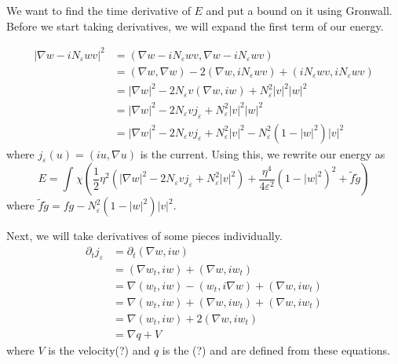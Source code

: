 \documentclass[a4paper]{article}
\begin{document}
We want to find the time derivative of $E$ and put a bound on it using Gronwall.
Before we start taking derivatives, we will expand the first term of our energy.

\begin{align*}
  |\nabla w - iN_\varepsilon w v|^2 &= ( \nabla w - iN_\varepsilon w v , \nabla w - iN_\varepsilon w v ) \\
  &= (\nabla w, \nabla w ) - 2 ( \nabla w, iN_\varepsilon w v ) + ( i N_\varepsilon w v, i N_\varepsilon w v ) \\
  &= | \nabla w |^2 - 2 N_\varepsilon v ( \nabla w, iw ) + N_\varepsilon^2 |v|^2 |w|^2 \\
  &= | \nabla w |^2 - 2 N_\varepsilon v j_\varepsilon + N_\varepsilon^2 |v|^2 |w|^2 \\
  &= | \nabla w |^2 - 2 N_\varepsilon v j_\varepsilon + N_\varepsilon^2 |v|^2 - N_\varepsilon^2 ( 1 - |w|^2 )|v|^2
\end{align*}
where $j_\varepsilon(u) = (iu, \nabla u)$ is the current.
Using this, we rewrite our energy as
\begin{equation} \label{eqn:energy_form}
  E = \int_{}^{} \chi \left( \frac{1}{2} \eta^2 \left( | \nabla w |^2 - 2 N_\varepsilon v j_\varepsilon + N_\varepsilon^2 |v|^2
  \right) + \frac{\eta^4}{4 \varepsilon^2} ( 1 - |w|^2)^2 + \tilde{f} \tilde{g} \right)
\end{equation}
where $\tilde{f} \tilde{g} = fg - N_\varepsilon^2 (1 - |w|^2) |v|^2$.

Next, we will take derivatives of some pieces individually.
\begin{align} \label{eqn:current_deriv}
  \partial_t j_\varepsilon &= \partial_t (\nabla w, iw) \nonumber \\
  &= ( \nabla w_t, iw ) + ( \nabla w, i w_t) \nonumber \\
  &= \nabla( w_t, iw) - (w_t, i \nabla w) + ( \nabla w, i w_t) \nonumber \\
  &= \nabla( w_t, iw) + (\nabla w, i w_t) + ( \nabla w, i w_t) \nonumber \\
  &= \nabla( w_t, iw) + 2(\nabla w, i w_t) \\
  &= \nabla q + V \nonumber
\end{align}
where $V$ is the velocity(?) and $q$ is the (?) and are defined from these equations.
\end{document}
